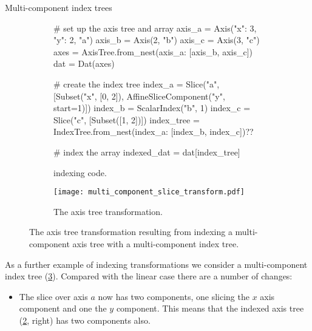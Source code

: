 \documentclass[thesis]{subfiles}
\begin{document}
\begin{example}{Multi-component index trees}

\begin{figure}
  \centering

  \begin{subfigure}{.9\textwidth}
    \begin{pyalg2}
      # set up the axis tree and array
      axis_a = Axis({"x": 3, "y": 2}, "a")
      axis_b = Axis(2, "b")
      axis_c = Axis(3, "c")
      axes = AxisTree.from_nest({axis_a: [axis_b, axis_c]})
      dat = Dat(axes)

      # create the index tree
      index_a = Slice("a", [Subset("x", [0, 2]),
                            AffineSliceComponent("y", start=1)])
      index_b = ScalarIndex("b", 1)
      index_c = Slice("c", [Subset([1, 2])])
      index_tree = IndexTree.from_nest({index_a: [index_b, index_c]})?\label{code:multi_component_make_index_tree}?

      # index the array
      indexed_dat = dat[index_tree]
    \end{pyalg2}

    \caption{ indexing code.}
    \label{fig:multi_component_slice_code}
  \end{subfigure}

  \vspace{1em}

  \begin{subfigure}{\textwidth}
    \centering
    \texttt{[image: multi\_component\_slice\_transform.pdf]}
    \caption{
      The axis tree transformation.
    }
    \label{fig:multi_component_slice_transform_flowchart}
  \end{subfigure}

  \caption{
    The axis tree transformation resulting from indexing a multi-component axis tree with a multi-component index tree.
  }
  \label{fig:multi_component_slice}
\end{figure}

As a further example of indexing transformations we consider a multi-component index tree (\cref{fig:multi_component_slice}).
Compared with the linear case there are a number of changes:

\begin{itemize}
  \item
    The slice over axis $a$ now has two components, one slicing the $x$ axis component and one the $y$ component.
    This means that the indexed axis tree (\cref{fig:multi_component_slice_transform_flowchart}, right) has two components also.


\end{itemize}
\end{example}
\end{document}
